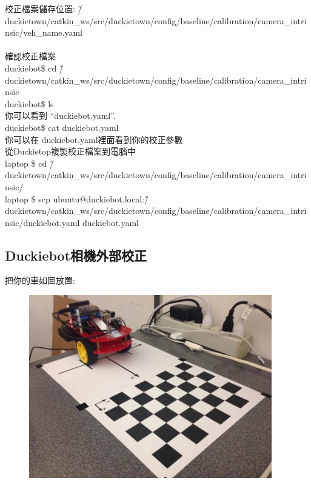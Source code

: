 \documentclass{article}
\begin{document}
校正檔案儲存位置: \~/duckietown/catkin\_ws/src/duckietown/config/baseline/calibration/camera\_intrinsic/veh\_name.yaml
\\
\\確認校正檔案
\\duckiebot\$ cd \~/duckietown/catkin\_ws/src/duckietown/config/baseline/calibration/camera\_intrinsic
\\duckiebot\$ ls
\\你可以看到 “duckiebot.yaml”.
\\duckiebot\$ cat duckiebot.yaml
\\你可以在 duckiebot.yaml裡面看到你的校正參數
\\從Duckietop複製校正檔案到電腦中
\\laptop \$ cd \~/duckietown/catkin\_ws/src/duckietown/config/baseline/calibration/camera\_intrinsic/
\\laptop \$ scp ubuntu@duckiebot.local:\~/duckietown/catkin\_ws/src/duckietown/config/baseline/calibration/camera\_intrinsic/duckiebot.yaml duckiebot.yaml

\subsection{Duckiebot相機外部校正}

把你的車如圖放置:
\\
\begin{figure}[htp]
    \begin{center}
        \includegraphics[width=300pt]{pic/圖片16.jpg}
    \end{center}
\end{figure}
\end{document}
